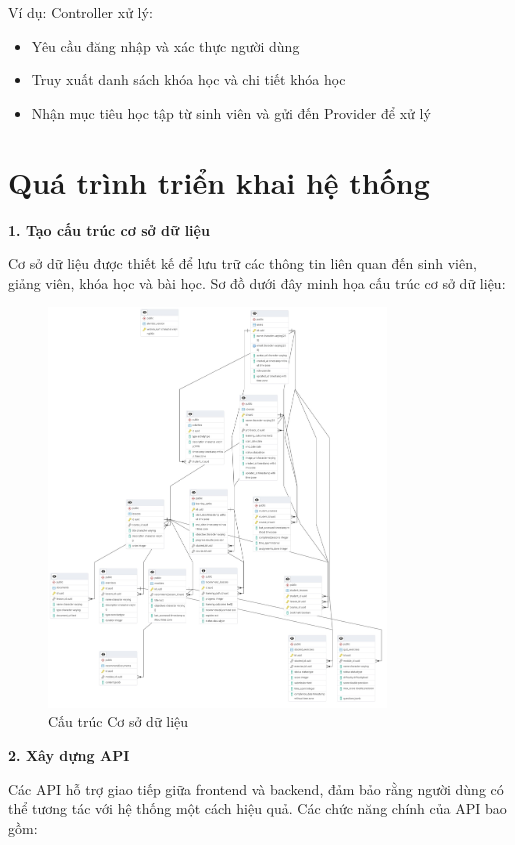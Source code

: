 Ví dụ: Controller xử lý:

\begin{itemize}
    \item Yêu cầu đăng nhập và xác thực người dùng
    \item Truy xuất danh sách khóa học và chi tiết khóa học
    \item Nhận mục tiêu học tập từ sinh viên và gửi đến Provider để xử lý
\end{itemize}

\section{Quá trình triển khai hệ thống}

\textbf{1. Tạo cấu trúc cơ sở dữ liệu} 

Cơ sở dữ liệu được thiết kế để lưu trữ các thông tin liên quan đến sinh viên, giảng viên, khóa học và bài học. Sơ đồ dưới đây minh họa cấu trúc cơ sở dữ liệu:

\begin{figure}[H]
    \centering
    \includegraphics[width=0.8\textwidth]{Images/Implement/DB_diagram.jpg}
    \caption{Cấu trúc Cơ sở dữ liệu}
\end{figure}

\textbf{2. Xây dựng API} 

Các API hỗ trợ giao tiếp giữa frontend và backend, đảm bảo rằng người dùng có thể tương tác với hệ thống một cách hiệu quả. Các chức năng chính của API bao gồm:


